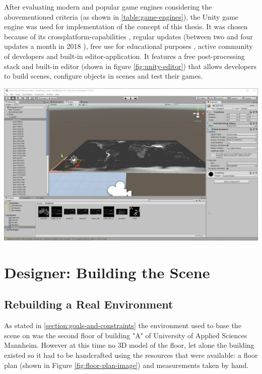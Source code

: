 After evaluating modern and popular game engines considering the abovementioned criteria (as shown in \ref{table:game-engines}), the Unity game engine was used for implementation of the concept of this thesis. It was chosen because of its crossplatform-capabilities \cite{UnityPlatformSupport}, regular updates (between two and four updates a month in 2018 \cite{UnityDownloadArchive}), free use for educational purposes \cite{UnityForEducation}, active community of developers \cite{UnityForum} and built-in editor-application. It features a free post-processing stack \cite{UnityPostProcessingStack} and built-in editor (shown in figure \ref{fig:unity-editor}) that allows developers to build scenes, configure objects in scenes and test their games.
\begin{center}
\noindent\includegraphics[width=14cm]{tex/img/ch05/UnityScreenshot.png}
\label{fig:unity-editor}
\end{center}

\section{Designer: Building the Scene}
\subsection{Rebuilding a Real Environment}
As stated in \ref{section:goals-and-constraints} the environment used to base the scene on was the second floor of building "A" of University of Applied Sciences Mannheim. However at this time no 3D model of the floor, let alone the building existed so it had to be handcrafted using the resources that were available: a floor plan (shown in Figure \ref{fig:floor-plan-image}) and measurements taken by hand.

